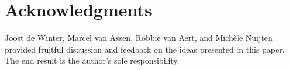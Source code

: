 \section*{Acknowledgments}
Joost de Winter, Marcel van Assen, Robbie van Aert, and Michèle Nuijten provided fruitful discussion and feedback on the ideas presented in this paper. The end result is the author's sole responsibility.